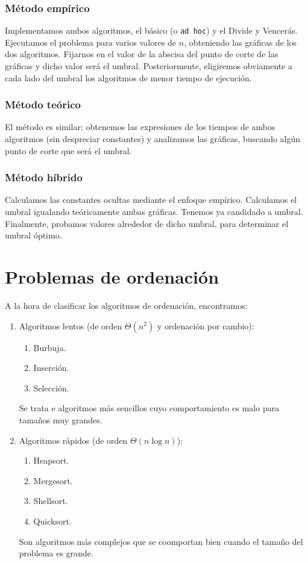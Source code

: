 \subsubsection{Método empírico}
Implementamos ambos algoritmos, el básico (o \verb|ad hoc|) y el Divide y Vencerás. Ejecutamos el problema para varios valores de $n$, obteniendo las gráficas de los dos algoritmos. Fijarnos en el valor de la abscisa del punto de corte de las gráficas y dicho valor será el umbral. Posteriormente, eligiremos obviamente a cada lado del umbral los algoritmos de menor tiempo de ejecución.

\subsubsection{Método teórico}
El método es similar: obtenemos las expresiones de los tiempos de ambos algoritmos (sin despreciar constantes) y analizamos las gráficas, buscando algún punto de corte que será el umbral.

\subsubsection{Método híbrido}
Calculamos las constantes ocultas mediante el enfoque empírico. Calculamos el umbral igualando teóricamente ambas gráficas. Tenemos ya candidado a umbral. Finalmente, probamos valores alrededor de dicho umbral, para determinar el umbral óptimo.

\section{Problemas de ordenación}
A la hora de clasificar los algoritmos de ordenación, encontramos:
\begin{enumerate}
    \item Algoritmos lentos (de orden $\Theta(n^2)$ y ordenación por cambio):
        \begin{enumerate}
            \item Burbuja.
            \item Inserción.
            \item Selección.
        \end{enumerate}
        Se trata e algoritmos más sencillos cuyo comportamiento es malo para tamaños muy grandes.
    \item Algoritmos rápidos (de orden $\Theta(n\log n)$):
        \begin{enumerate}
            \item Heapsort.
            \item Mergesort.
            \item Shellsort.
            \item Quicksort.
        \end{enumerate}
        Son algoritmos más complejos que se coomportan bien cuando el tamaño del problema es grande.
\end{enumerate}

